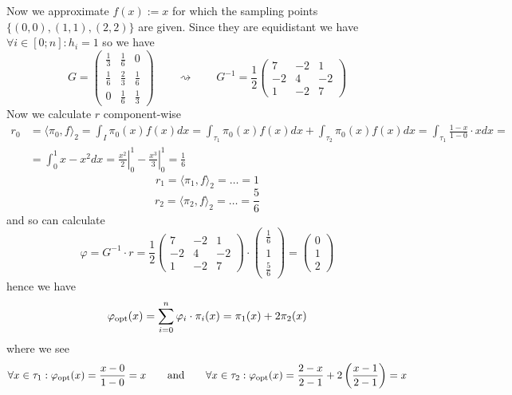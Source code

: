 \begin{example}
   Now we approximate \(f(x) := x\) for which the sampling points \(\{(0, 0), (1, 1), (2, 2)\}\) are given.
   Since they are equidistant we have \(\forall i \in [0; n]: h_i = 1\) so we have
   \[G = \begin{pmatrix}
         \frac{1}{3} & \frac{1}{6} & 0\\
         \frac{1}{6} & \frac{2}{3} & \frac{1}{6}\\
         0 & \frac{1}{6} & \frac{1}{3}
      \end{pmatrix} \qquad\rightsquigarrow\qquad G^{-1} = \frac{1}{2}\begin{pmatrix}
         7 & -2 & 1\\
         -2 & 4 & -2\\
         1 & -2 & 7
   \end{pmatrix}\]
   Now we calculate \(r\) component-wise
   \begin{equation*}
      \begin{split}
         r_0 & = \langle \pi_0, f\rangle_2 = \int_I \pi_0(x)f(x)dx = \int_{\tau_1} \pi_0(x)f(x)dx + \int_{\tau_2} \pi_0(x)f(x)dx = \int_{\tau_1} \frac{1 - x}{1 - 0} \cdot x dx = \\
             & = \int_0^1 x - x^2dx = \left.\frac{x^2}{2}\right\rvert_0^1 - \left.\frac{x^3}{3}\right\rvert_0^1 = \frac{1}{6}
      \end{split}
   \end{equation*}
   \[r_1 = \langle \pi_1, f\rangle_2 = \ldots = 1\]
   \[r_2 = \langle \pi_2, f\rangle_2 = \ldots = \frac{5}{6}\]
   and so can calculate
   \[\varphi = G^{-1} \cdot r = \frac{1}{2}\begin{pmatrix}7&-2&1\\-2&4&-2\\1&-2&7\end{pmatrix} \cdot \begin{pmatrix}\frac{1}{6}\\1\\\frac{5}{6}\end{pmatrix} = \begin{pmatrix}0\\1\\2\end{pmatrix}\]
   hence we have
   \[\varphi_{\operatorname{opt}}(x) = \sum_{i=0}^n \varphi_i \cdot \pi_i(x) = \pi_1(x) + 2\pi_2(x)\]
   where we see
   \[\forall x \in \tau_1: \varphi_{\operatorname{opt}}(x) = \frac{x - 0}{1 - 0} = x \qquad\text{and}\qquad \forall x \in \tau_2: \varphi_{\operatorname{opt}}(x) = \frac{2 - x}{2 - 1} + 2\left(\frac{x - 1}{2 - 1}\right) = x\]
\end{example}


